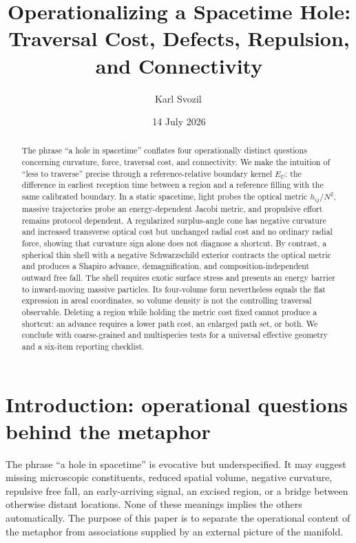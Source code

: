 \documentclass[aps,prd,twocolumn,amsmath,amssymb,nofootinbib]{revtex4-2}
\begin{document}
\title{Operationalizing a Spacetime Hole:
\texorpdfstring{\\\large}{ }Traversal Cost, Defects, Repulsion, and Connectivity}
\author{Karl Svozil\,}
\date{14 July 2026}

\begin{abstract}
The phrase ``a hole in spacetime'' conflates four operationally distinct
questions concerning curvature, force, traversal cost, and connectivity.  We
make the intuition of ``less to traverse'' precise through a
reference-relative boundary kernel $E_U$: the difference in earliest reception
time between a region and a reference filling with the same calibrated
boundary.  In a static spacetime, light probes the optical metric
$h_{ij}/N^2$, massive trajectories probe an energy-dependent Jacobi metric,
and propulsive effort remains protocol dependent.  A regularized surplus-angle
cone has negative curvature and increased transverse optical cost but unchanged
radial cost and no ordinary radial force, showing that curvature sign alone
does not diagnose a shortcut.  By contrast, a spherical thin shell with a
negative Schwarzschild exterior contracts the optical metric and produces a
Shapiro advance, demagnification, and composition-independent outward free
fall.  The shell requires exotic surface stress and presents an energy barrier
to inward-moving massive particles.  Its four-volume form nevertheless equals
the flat expression in areal coordinates, so volume density is not the
controlling traversal observable.  Deleting a region while holding the metric
cost fixed cannot produce a shortcut: an advance requires a lower path cost,
an enlarged path set, or both.  We conclude with coarse-grained and
multispecies tests for a universal effective geometry and a six-item reporting
checklist.
\end{abstract}

\maketitle

\section{Introduction: operational questions behind the metaphor}
\label{sec:introduction}

The phrase ``a hole in spacetime'' is evocative but underspecified.  It may
suggest missing microscopic constituents, reduced spatial volume, negative
curvature, repulsive free fall, an early-arriving signal, an excised region, or
a bridge between otherwise distant locations.  None of these meanings implies
the others automatically.  The purpose of this paper is to separate the
operational content of the metaphor from associations supplied by an external
picture of the manifold.
\end{document}
